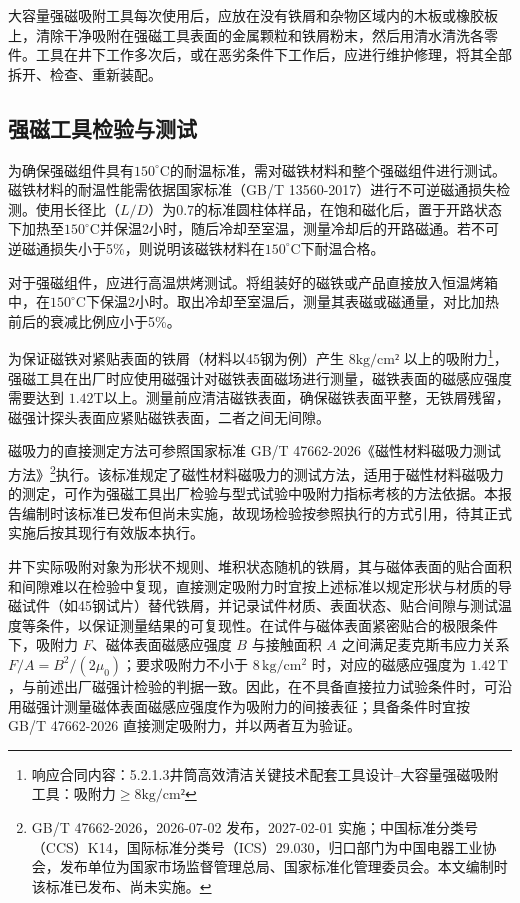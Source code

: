 大容量强磁吸附工具每次使用后，应放在没有铁屑和杂物区域内的木板或橡胶板上，清除干净吸附在强磁工具表面的金属颗粒和铁屑粉末，然后用清水清洗各零件。工具在井下工作多次后，或在恶劣条件下工作后，应进行维护修理，将其全部拆开、检查、重新装配。

\subsection{强磁工具检验与测试}

为确保强磁组件具有$150^{\circ}\mathrm{C}$的耐温标准，需对磁铁材料和整个强磁组件进行测试。磁铁材料的耐温性能需依据国家标准（GB/T 13560-2017）进行不可逆磁通损失检测。使用长径比（$L/D$）为$0.7$的标准圆柱体样品，在饱和磁化后，置于开路状态下加热至$150^{\circ}\mathrm{C}$并保温2小时，随后冷却至室温，测量冷却后的开路磁通。若不可逆磁通损失小于5\%，则说明该磁铁材料在$150^{\circ}\mathrm{C}$下耐温合格。

对于强磁组件，应进行高温烘烤测试。将组装好的磁铁或产品直接放入恒温烤箱中，在$150^{\circ}\mathrm{C}$下保温2小时。取出冷却至室温后，测量其表磁或磁通量，对比加热前后的衰减比例应小于5\%。

为保证磁铁对紧贴表面的铁屑（材料以45钢为例）产生 $8 \mathrm{kg/cm²}$ 以上的吸附力\footnote{响应合同内容：5.2.1.3井筒高效清洁关键技术配套工具设计--大容量强磁吸附工具：吸附力$\ge 8 \mathrm{kg/cm²}$}，强磁工具在出厂时应使用磁强计对磁铁表面磁场进行测量，磁铁表面的磁感应强度需要达到 $1.42 \mathrm{T}$以上。测量前应清洁磁铁表面，确保磁铁表面平整，无铁屑残留，磁强计探头表面应紧贴磁铁表面，二者之间无间隙。

磁吸力的直接测定方法可参照国家标准 GB/T 47662-2026《磁性材料磁吸力测试方法》\footnote{GB/T 47662-2026，2026-07-02 发布，2027-02-01 实施；中国标准分类号（CCS）K14，国际标准分类号（ICS）29.030，归口部门为中国电器工业协会，发布单位为国家市场监督管理总局、国家标准化管理委员会。本文编制时该标准已发布、尚未实施。}执行。该标准规定了磁性材料磁吸力的测试方法，适用于磁性材料磁吸力的测定，可作为强磁工具出厂检验与型式试验中吸附力指标考核的方法依据。本报告编制时该标准已发布但尚未实施，故现场检验按参照执行的方式引用，待其正式实施后按其现行有效版本执行。

井下实际吸附对象为形状不规则、堆积状态随机的铁屑，其与磁体表面的贴合面积和间隙难以在检验中复现，直接测定吸附力时宜按上述标准以规定形状与材质的导磁试件（如45钢试片）替代铁屑，并记录试件材质、表面状态、贴合间隙与测试温度等条件，以保证测量结果的可复现性。在试件与磁体表面紧密贴合的极限条件下，吸附力 $F$、磁体表面磁感应强度 $B$ 与接触面积 $A$ 之间满足麦克斯韦应力关系 $F/A=B^{2}/(2\mu_0)$；要求吸附力不小于 $8\,\mathrm{kg/cm^2}$ 时，对应的磁感应强度为 $1.42\,\mathrm{T}$，与前述出厂磁强计检验的判据一致。因此，在不具备直接拉力试验条件时，可沿用磁强计测量磁体表面磁感应强度作为吸附力的间接表征；具备条件时宜按 GB/T 47662-2026 直接测定吸附力，并以两者互为验证。

